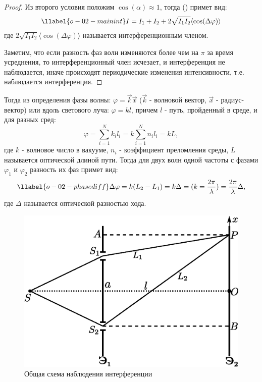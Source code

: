 \begin{proof}
Из второго условия положим $\cos(\alpha)\approx 1$, тогда () примет вид:
\begin{gather}
\llabel{o-02-mainint}
I = I_1 + I_2 + 2\sqrt{I_1 I_2}\langle\cos(\Delta \varphi)\rangle
\end{gather}
где $2\sqrt{I_1 I_2}\langle\cos(\Delta \varphi)\rangle$ называется интерференционным членом.

Заметим, что если разность фаз волн изменяются более чем на $\pi$ за время усреднения, то интерференционный член исчезает, и интерференция не наблюдается, иначе происходят периодические изменения интенсивности, т.е. наблюдается интерференция.
\end{proof}

Тогда из определения фазы волны: $\varphi = \vec{k}\vec{x}$ ($\vec{k}$ - волновой вектор, $\vec{x}$ - радиус-вектор) или вдоль светового луча: $\varphi = kl$, причем $l$ - путь, пройденный в среде, и для разных сред:
$$
\varphi = \sum_{i=1}^{N}k_i l_i = k\sum_{i=1}^{N}n_i l_i = kL,
$$
где $k$ - волновое число в вакууме, $n_i$ - коэффициент преломления среды, $L$ называется оптической длиной пути.
Тогда для двух волн одной частоты с фазами $\varphi_1$ и $\varphi_2$ разность их фаз примет вид:
\begin{gather}
\llabel{o-02-phasediff}
\Delta \varphi = k(L_2 - L_1) = k \Delta =
(k = \frac{2\pi}{\lambda}) =
\frac{2\pi}{\lambda}\Delta,
\end{gather}
где $\Delta$ называется оптической разностью хода. 

\begin{figure}
	\includegraphics[width=1\linewidth]{img/o-02}{}
	\caption{Общая схема наблюдения интерференции}
\end{figure}
 
